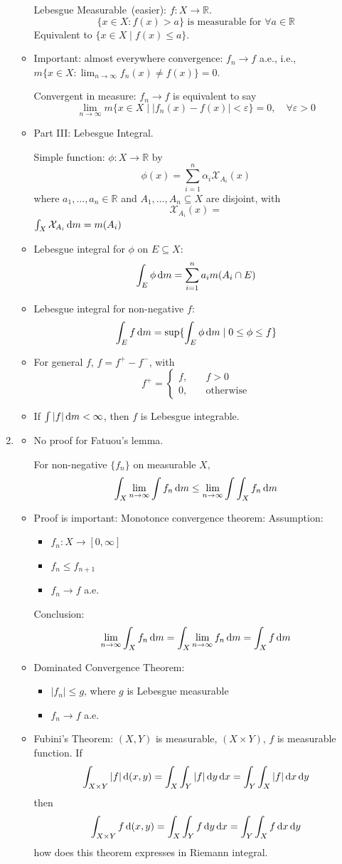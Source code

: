 \begin{enumerate}
\begin{itemize}
Lebesgue Measurable~(easier):
$f:X\to\mathbb{R}$.
\[
\{x\in X:f(x)>a\}\text{ is measurable for }\forall a\in\mathbb{R}
\]
Equivalent to $\{x\in X\mid f(x)\le a\}$.
\item
Important: almost everywhere convergence:
$f_n\to f$ a.e., i.e., $m\{x\in X:\lim_{n\to\infty}f_n(x)\ne f(x)\}=0$.

Convergent in measure: 
$f_n\to f$ is equivalent to say
\[
\lim_{n\to\infty}m\{x\in X\mid |f_n(x)-f(x)|<\varepsilon\}=0,\quad\forall\varepsilon>0
\]
\item
Part III: Lebesgue Integral.

Simple function: $\phi:X\to\mathbb{R}$ by 
\[
\phi(x) = \sum_{i=1}^n\alpha_i\mathcal{X}_{A_i}(x)
\]
where $a_1,\dots,a_n\in\mathbb{R}$ and $A_1,\dots,A_n\subseteq X$ are disjoint, with
\[
\mathcal{X}_{A_i}(x)=
\]
$\int_{X}\mathcal{X}_{A_i}\,\mathrm{d} m = m(A_i)$
\item
Lebesgue integral for $\phi$ on $E\subseteq X$:
\[
\int_E\phi\,\mathrm{d} m =\sum_{i=1}^na_im(A_i\cap E)
\]
\item
Lebesgue integral for non-negative $f$:
\[
\int_Ef\,\mathrm{d} m =  \sup\{\int_E\phi\,\mathrm{d} m \mid 0\le\phi\le f\}
\]
\item
For general $f$, $f = f^+- f^-$, with
\[
f^+=\left\{
\begin{aligned}
f,&\quad f>0\\
0,&\quad\text{otherwise}
\end{aligned}
\right.
\]
\item
If $\int|f|\,\mathrm{d} m<\infty$, then $f$ is Lebesgue integrable.
\end{itemize}
\item
\begin{itemize}
\item
No proof for Fatuou's lemma.

For non-negative $\{f_n\}$ on measurable $X,$
\[
\int_X\lim_{n\to\infty}\int f_n\,\mathrm{d} m \le \lim_{n\to\infty}\int \int_Xf_n\,\mathrm{d} m
\]
\item
Proof is important: Monotonce convergence theorem:
Assumption:
\begin{itemize}
\item
$f_n:X\to[0,\infty]$
\item
$f_n\le f_{n+1}$
\item
$f_n\to f$ a.e.
\end{itemize}
Conclusion:
\[
\lim_{n\to\infty}\int_Xf_n\,\mathrm{d} m =\int_X\lim_{n\to\infty}f_n\,\mathrm{d} m = \int _Xf\,\mathrm{d} m
\]
\item
Dominated Convergence Theorem:
\begin{itemize}
\item
$|f_n|\le g$, where $g$ is Lebesgue measurable
\item
$f_n\to f$ a.e.
\end{itemize}
\item
Fubini's Theorem: 
$(X,Y)$ is measurable, $(X\times Y)$, $f$ is measurable function.
If 
\[
\int_{X\times Y}|f|\,\mathrm{d}(x,y) = \int _X\int_Y|f|\,\mathrm{d} y\,\mathrm{d} x = \int_Y\int_X|f|\,\mathrm{d} x\,\mathrm{d} y
\]
then
\[
\int_{X\times Y}f\,\mathrm{d}(x,y) = \int _X\int_Yf\,\mathrm{d} y\,\mathrm{d} x = \int_Y\int_Xf\,\mathrm{d} x\,\mathrm{d} y
\]
how does this theorem expresses in Riemann integral.


\end{itemize}
\end{enumerate}

